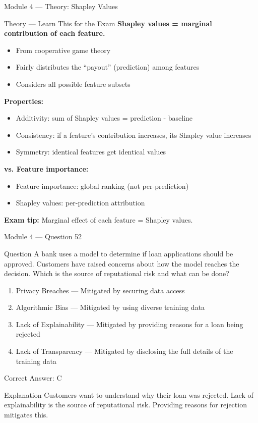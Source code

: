 \documentclass[aspectratio=169,10pt]{beamer}
\newcommand{\question}[1]{%
	\begin{block}{Question}
		#1
	\end{block}
}
\newcommand{\options}[4]{%
	\begin{enumerate}[label=\Alph*.,leftmargin=*]
		\item #1
		\item #2
		\item #3
		\item #4
	\end{enumerate}
}
\newcommand{\answerbox}[1]{%
	\begin{exampleblock}{Correct Answer: #1}
	\end{exampleblock}
}
\newcommand{\explain}[1]{%
	\begin{block}{Explanation}
		\small #1
	\end{block}
}
\newcommand{\theory}[1]{%
	\begin{block}{Theory --- Learn This for the Exam}
		\small #1
	\end{block}
}
\begin{document}
	\begin{frame}{Module 4 --- Theory: Shapley Values}
		\theory{
			\textbf{Shapley values = marginal contribution of each feature.}
			\begin{itemize}
				\item From cooperative game theory
				\item Fairly distributes the ``payout'' (prediction) among features
				\item Considers all possible feature subsets
			\end{itemize}
			\textbf{Properties:}
			\begin{itemize}
				\item Additivity: sum of Shapley values = prediction - baseline
				\item Consistency: if a feature's contribution increases, its Shapley value increases
				\item Symmetry: identical features get identical values
			\end{itemize}
			\textbf{vs. Feature importance:}
			\begin{itemize}
				\item Feature importance: global ranking (not per-prediction)
				\item Shapley values: per-prediction attribution
			\end{itemize}
			\textbf{Exam tip:} Marginal effect of each feature = Shapley values.
		}
	\end{frame}
	
	\begin{frame}{Module 4 --- Question 52}
		\question{A bank uses a model to determine if loan applications should be approved. Customers have raised concerns about how the model reaches the decision. Which is the source of reputational risk and what can be done?}
		\options{Privacy Breaches --- Mitigated by securing data access}{Algorithmic Bias --- Mitigated by using diverse training data}{Lack of Explainability --- Mitigated by providing reasons for a loan being rejected}{Lack of Transparency --- Mitigated by disclosing the full details of the training data}
		\answerbox{C}
		\explain{Customers want to understand why their loan was rejected. Lack of explainability is the source of reputational risk. Providing reasons for rejection mitigates this.}
	\end{frame}
	
\end{document}

